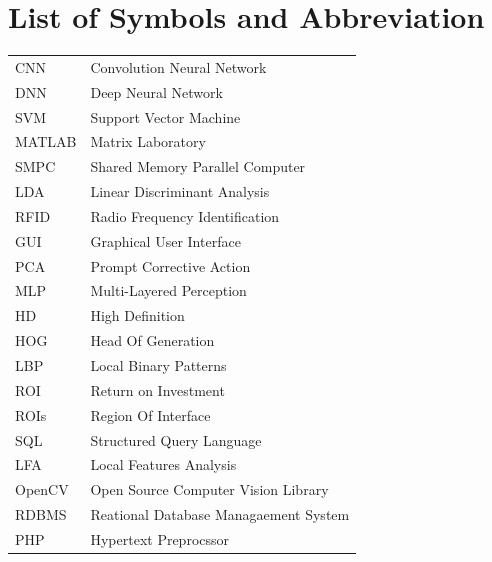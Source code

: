 				\section*{List of Symbols and Abbreviation}
			\endgroup
		\normalsize
		\begin{tabular}{p{1in}p{3in}}
			CNN & Convolution Neural Network\\
                DNN & Deep Neural Network\\
                SVM & Support Vector Machine\\
                MATLAB & Matrix Laboratory\\
                SMPC & Shared Memory Parallel Computer\\
                LDA & Linear Discriminant Analysis\\
                RFID & Radio Frequency  Identification\\
                GUI & Graphical User Interface\\
                PCA & Prompt Corrective Action\\
                MLP & Multi-Layered Perception\\
                HD & High Definition\\
                HOG & Head Of Generation\\
                LBP & Local Binary Patterns\\
                ROI & Return on Investment\\
                ROIs & Region Of Interface\\
                SQL & Structured Query Language\\
                LFA & Local Features Analysis\\
                OpenCV & Open Source Computer Vision Library\\
                RDBMS & Reational Database Managaement System\\
                PHP & Hypertext Preprocssor\\
                
		\end{tabular}
		\break